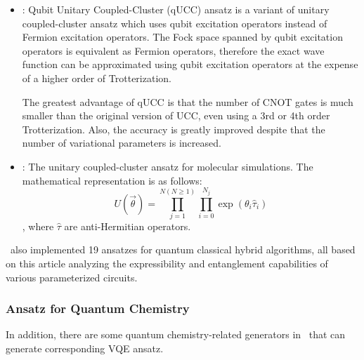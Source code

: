 \begin{itemize}
    \item \QubitUCCAnsatz: Qubit Unitary Coupled-Cluster (qUCC) ansatz is a variant of unitary coupled-cluster ansatz which uses qubit excitation operators instead of Fermion excitation operators\cite{PhysRevA.102.062612}. The Fock space spanned by qubit excitation operators is equivalent as Fermion operators, therefore the exact wave function can be approximated using qubit excitation operators at the expense of a higher order of Trotterization.

          The greatest advantage of qUCC is that the number of CNOT gates is much smaller than the original version of UCC, even using a 3rd or 4th order Trotterization. Also, the accuracy is greatly improved despite that the number of variational parameters is increased.

    \item \UCCAnsatz: The unitary coupled-cluster ansatz for molecular simulations. The mathematical representation is as follows:
          $$U(\vec{\theta}) = \prod_{j=1}^{N(N\ge1)}{\prod_{i=0}^{N_{j}}{\exp{(\theta_{i}\hat{\tau}_{i})}}}$$,
          where $\hat{\tau}$ are anti-Hermitian operators.
\end{itemize}

\MindQuantum \ also implemented 19 ansatzes for quantum classical hybrid algorithms, all based on this article analyzing the expressibility and entanglement capabilities of various parameterized circuits\cite{Sim_2019}.

\subsubsection{Ansatz for Quantum Chemistry}

In addition, there are some quantum chemistry-related generators in \MindQuantum \ that can generate corresponding VQE ansatz.


